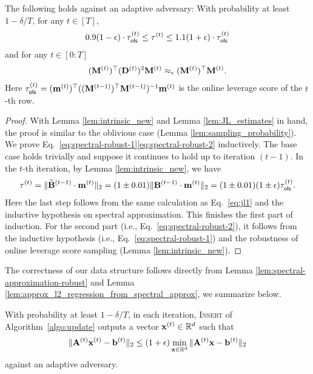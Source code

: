 \begin{lemma}
\label{lem:spectral-approximation-robust}
The following holds against an adaptive adversary: With probability at least $1 - \delta/T$, for any $t \in [T]$,
\begin{align}
    0.9 (1-\epsilon) \cdot \tau_{\mathsf{ols}}^{(t)} \leq \tau^{(t)} \leq 1.1 (1+\epsilon) \cdot \tau_{\mathsf{ols}}^{(t)} \label{eq:spectral-robust-1}
\end{align}
and for any $t \in [0: T]$ 
\begin{align}
    (\mathbf{M}^{(t)})^{\top} (\mathbf{D}^{(t)})^2 \mathbf{M}^{(t)} \approx_{\epsilon} (\mathbf{M}^{(t)})^{\top} \mathbf{M}^{(t)}.\label{eq:spectral-robust-2}
\end{align}
Here $\tau_{\mathsf{ols}}^{(t)} = (\mathbf{m}^{(t)})^{\top} ((\mathbf{M}^{(t-1)})^\top \mathbf{M}^{(t-1)})^{-1}\mathbf{m}^{(t)}$ is the online leverage score of the $t$-th row.
\end{lemma}
\begin{proof}
With Lemma \ref{lem:intrinsic_new} and Lemma \ref{lem:JL_estimates} in hand, the proof is similar to the oblivious case (Lemma \ref{lem:sampling_probability}). We prove Eq.~\eqref{eq:spectral-robust-1}\eqref{eq:spectral-robust-2} inductively. The base case holds trivially and suppose it continues to hold up to iteration $(t-1)$. In the $t$-th iteration, by Lemma \ref{lem:intrinsic_new}, we have
\begin{align*}
\tau^{(t)} = \|\widetilde{\mathbf{B}}^{(t-1)} \cdot \mathbf{m}^{(t)}\|_2 = (1 \pm 0.01) \|\mathbf{B}^{(t-1)} \cdot \mathbf{m}^{(t)}\|_2 = (1 \pm 0.01)(1\pm \epsilon) \tau_{\mathsf{ols}}^{(t)}. 
\end{align*}
Here the last step follows from the same calculation as Eq.~\eqref{eq:jl1} and the inductive hypothesis on spectral approximation. This finishes the first part of induction. For the second part (i.e., Eq.~\eqref{eq:spectral-robust-2}), it follows from the inductive hypothesis (i.e., Eq.~\eqref{eq:spectral-robust-1}) and the robustness of online leverage score sampling (Lemma \ref{lem:intrinsic_new}). 
\end{proof}

The correctness of our data structure follows directly from Lemma \ref{lem:spectral-approximation-robust} and Lemma \ref{lem:approx_l2_regression_from_spectral_approx}, we summarize below.
\begin{lemma}\label{lem:correctness_algorithm-adaptive}
With probability at least $1 - \delta/T$, in each iteration, \textsc{Insert} of Algorithm~\ref{algo:update} outputs a vector $\mathbf{x}^{(t)} \in \mathbb{R}^d$ such that 
    \[
    \|\mathbf{A}^{(t)} \mathbf{x}^{(t)} - \mathbf{b}^{(t)}\|_2 \leq (1+\epsilon) \min_{\mathbf{x} \in \mathbb{R}^d} \|\mathbf{A}^{(t)} \mathbf{x} - \mathbf{b}^{(t)} \|_2
    \]
against an adaptive adversary.
\end{lemma}





